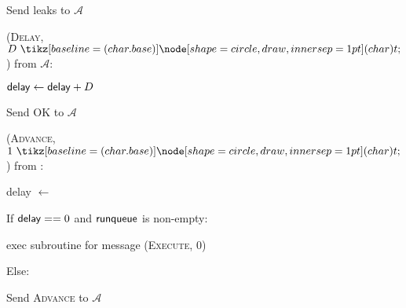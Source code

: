 \begin{bbox}[title={\textbf{Wrapper} $\mathcal{W}_{\msf{async}}$} ]
	\quad Send \textsf{leaks} to $\mathcal{A}$
	
\OnInput (\textsc{Delay}, $D \token$) from $\mathcal{A}$:

	\quad ${\mathsf {delay}} \leftarrow {\mathsf {delay}} + D$
	
	\quad Send \textsc{OK} to $\mathcal{A}$
	
\OnInput (\textsc{Advance}, $1 \token$) from \Env:

	\quad \textsf{delay} $\leftarrow$ 
	
	\quad If ${\mathsf {delay}} == 0$ and ${\mathsf {runqueue}}$ is non-empty:
	
		

		\qquad exec subroutine for message (\textsc{Execute}, 0)
	
	\quad Else:
	
		\qquad Send \textsc{Advance} to $\mathcal{A}$
		
	
\end{bbox}
